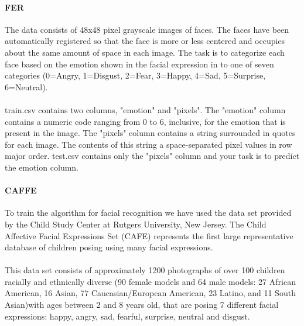 \documentclass[runningheads,a4paper,11pt]{report}
\begin{document}
\paragraph{FER}
The data consists of 48x48 pixel grayscale images of faces. The faces have been automatically registered so that the face is more or less centered and occupies about the same amount of space in each image. The task is to categorize each face based on the emotion shown in the facial expression in to one of seven categories (0=Angry, 1=Disgust, 2=Fear, 3=Happy, 4=Sad, 5=Surprise, 6=Neutral).

\paragraph{}
train.csv contains two columns, "emotion" and "pixels". The "emotion" column contains a numeric code ranging from 0 to 6, inclusive, for the emotion that is present in the image. The "pixels" column contains a string surrounded in quotes for each image. The contents of this string a space-separated pixel values in row major order. test.csv contains only the "pixels" column and your task is to predict the emotion column.

\paragraph{CAFFE}
To train the algorithm for facial recognition we have used the data set provided by the Child Study Center at Rutgers University, New Jersey.
The Child Affective Facial Expressions Set (CAFE)\cite{LoBlue2015} represents the first large representative database of children posing using many facial expressions.
\paragraph{}
This data set consists of approximately 1200 photographs of over 100 children racially and ethnically diverse (90 female models and 64 male models: 27 African American, 16 Asian, 77 Caucasian/European American, 23 Latino, and 11 South Asian)with ages between 2 and 8 years old, that are posing 7 different facial expressions:  happy, angry, sad, fearful, surprise, neutral and disgust.
\end{document}
